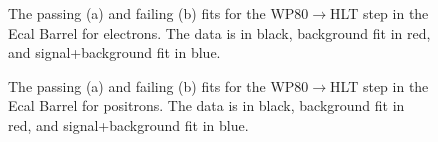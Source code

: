 \begin{thebibliography}{10}
\begin{figure}[htb]
  \begin{center}
    \caption{The passing (a) and failing (b) fits for the WP80$\to$HLT step in the Ecal Barrel for electrons.
             The data is in black, background fit in red, and signal+background fit in blue.}
  \end{center}
\end{figure}

\begin{figure}[htb]
  \begin{center}
    \caption{The passing (a) and failing (b) fits for the WP80$\to$HLT step in the Ecal Barrel for positrons.
             The data is in black, background fit in red, and signal+background fit in blue.}
  \end{center}
\end{figure}


\end{thebibliography}
